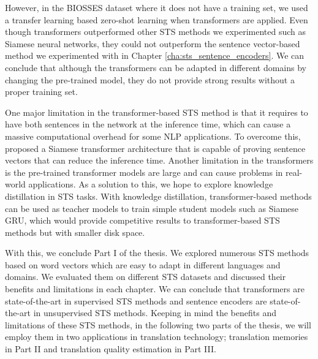 However, in the BIOSSES dataset where it does not have a training set, we used a transfer learning based zero-shot learning when transformers are applied. Even though transformers outperformed other STS methods we experimented such as Siamese neural networks, they could not outperform the sentence vector-based method we experimented with in Chapter \ref{cha:sts_sentence_encoders}. We can conclude that although the transformers can be adapted in different domains by changing the pre-trained model, they do not provide strong results without a proper training set. 

One major limitation in the transformer-based STS method is that it requires to have both sentences in the network at the inference time, which can cause a massive computational overhead for some NLP applications. To overcome this, \textcite{reimers-gurevych-2019-sentence} proposed a Siamese transformer architecture that is capable of proving sentence vectors that can reduce the inference time. Another limitation in the transformers is the pre-trained transformer models are large and can cause problems in real-world applications. As a solution to this, we hope to explore knowledge distillation \autocite{Gou2021} in STS tasks. With knowledge distillation, transformer-based methods can be used as teacher models to train simple student models such as Siamese GRU, which would provide competitive results to transformer-based STS methods but with smaller disk space. 

With this, we conclude Part I of the thesis. We explored numerous STS methods based on word vectors which are easy to adapt in different languages and domains. We evaluated them on different STS datasets and discussed their benefits and limitations in each chapter. We can conclude that transformers are state-of-the-art in supervised STS methods and sentence encoders are state-of-the-art in unsupervised STS methods. Keeping in mind the benefits and limitations of these STS methods, in the following two parts of the thesis, we will employ them in two applications in translation technology; translation memories in Part II and translation quality estimation in Part III.

